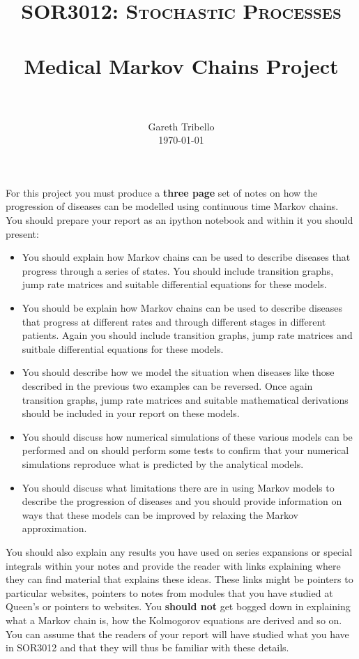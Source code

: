 \documentclass[paper=a4, fontsize=11pt]{scrartcl}
\title{\usefont{OT1}{bch}{b}{n} \normalfont \normalsize \textsc{SOR3012:
Stochastic Processes} \\ [25pt] \horrule{0.5pt} \\[0.4cm] 
\huge Medical Markov Chains Project \\
\horrule{2pt} \\[0.25cm]
}
\author{ \normalfont
\normalsize
        Gareth Tribello \\[-3pt] \normalsize
        \today
}
\date{}
\numberwithin{equation}{section}
\numberwithin{figure}{section}
\numberwithin{table}{section}
\begin{document}
\maketitle

For this project you must produce a {\bfseries three page} set of notes on how the progression of diseases can be modelled using continuous time Markov chains.  You should prepare your report as an 
ipython notebook and within it you should present:

\begin{itemize}
 \item You should explain how Markov chains can be used to describe diseases that progress through a series of states. You should include transition graphs, jump rate matrices and suitable 
 differential equations for these models.
 
 \item You should be explain how Markov chains can be used to describe diseases that progress at different rates and through different stages in different patients.  Again you should include transition graphs, jump rate matrices and suitbale differential equations for these models.

 \item You should describe how we model the situation when diseases like those described in the previous two examples can be reversed.  Once again transition graphs, jump rate matrices and suitable mathematical derivations should be included in your report on these models.

\item You should discuss how numerical simulations of these various models can be performed and on should perform some tests to confirm that your numerical simulations reproduce what is predicted by the analytical models.

 \item You should discuss what limitations there are in using Markov models to describe the progression of diseases and you should provide information on ways that these models can be improved by relaxing the Markov approximation.
\end{itemize}

You should also explain any results you have used on series expansions or special integrals within your notes and provide the reader with links explaining where they can find material that explains 
these ideas.  These links might be pointers to particular websites, pointers to notes from modules that you have studied at Queen's or pointers to websites.  You {\bfseries should not} get bogged down in 
explaining what a Markov chain is, how the Kolmogorov equations are derived and so on. You can assume that the readers of your report will have studied what you have in SOR3012 and that they will thus
be familiar with these details.
\end{document}
